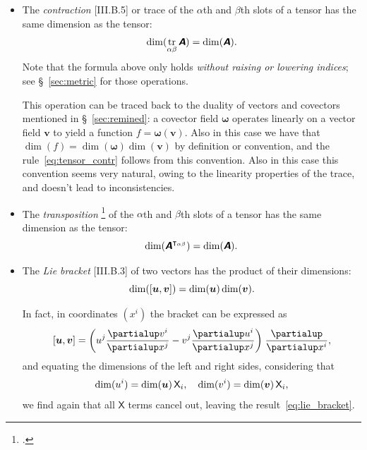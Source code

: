 \documentclass[\ifafour a4paper,12pt,\else a5paper,10pt,\fi%
onecolumn,oneside,article,%
british%
]{memoir}
\theoremstyle{remark}
\theoremstyle{innote}
\newcommand*{\mathte}[1]{\textbf{\textit{\textsf{#1}}}}
\newcommand*{\citep}{\footcites}
\newcommand*{\de}{\partialup}%
\DeclareMathOperator{\tr}{tr}%
\DeclarePairedDelimiter\clcl{[}{]}
\renewcommand*{\|}[1][]{\nonscript\,#1\vert\nonscript\;\mathopen{}}
\newcommand*{\sect}{\S}%
\newcommand*{\Xx}{\textsf{X}}
\newcommand*{\yA}{\mathte{A}}
\newcommand*{\yom}{\bm{\omega}}
\newcommand*{\yv}{\bm{v}}
\newcommand*{\yu}{\bm{u}}
\renewcommand*{\i}{\indices}
\newcommand*{\dex}[1][i]{\frac{\de}{\de x^{#1}}}
\begin{document}
\begin{itemize}[wide=0pt]
\item The \emph{contraction} [III.B.5] or trace of the $\alpha$th and $\beta$th
  slots of a tensor has the same dimension as the tensor:
  \begin{equation}
    \dim(\tr_{\alpha\beta}\yA) = \dim(\yA).
    \label{eq:tensor_contr}
  \end{equation}
  Note that the formula above only holds \emph{without raising or lowering
    indices}; see \sect~\ref{sec:metric} for those operations.

  This operation can be traced back to the duality of vectors and covectors
  mentioned in \sect~\ref{sec:remined}: a covector field $\yom$ operates
  linearly on a vector field $\yv$ to yield a function $f=\yom(\yv)$. Also
  in this case we have that $\dim(f)=\dim(\yom)\dim(\yv)$ by definition or
  convention, and the rule~\eqref{eq:tensor_contr} follows from this
  convention. Also in this case this convention seems very natural, owing
  to the linearity properties of the trace, and doesn't lead to
  inconsistencies.

  

\item The \emph{transposition} \citep[called \enquote{building an isomer}
  by][\sect~I.3 p.~13]{schouten1924_r1954}[\sect~II.4
  p.~20]{schouten1951_r1989} of the $\alpha$th and $\beta$th slots of a
  tensor has the same dimension as the tensor:
  \begin{equation}
    \dim(\yA^{\intercal_{\alpha\beta}}) = \dim(\yA).
    \label{eq:tensor_transp}
  \end{equation}


\item The \emph{Lie bracket} [III.B.3] of two vectors has the product of their dimensions:
  \begin{equation}
    \dim(\clcl{\yu,\yv}) =\dim(\yu)\dim(\yv).
    \label{eq:lie_bracket}
\end{equation}

In fact, in coordinates $(x^{i})$ the bracket can be expressed as
\begin{equation}
  \label{eq:bracket_coords}
  \clcl{\yu,\yv} =
  \biggl( u\i{^{j}}\frac{\de v\i{^{i}}}{\de x\i{^{j}}}
  - v\i{^{j}}\frac{\de u\i{^{i}}}{\de x\i{^{j}}} \biggr)\;\dex,
\end{equation}
and equating the dimensions of the left and right sides, considering that
\begin{equation}
  \label{eq:dim_u_and_v}
  \dim(u\i{^{i}}) = \dim(\yu)\,\Xx_{i},\quad
  \dim(v\i{^{i}}) = \dim(\yv)\,\Xx_{i},
\end{equation}
we find again that all $\Xx$ terms cancel out, leaving the
result~\eqref{eq:lie_bracket}.


\end{itemize}
\end{document}
